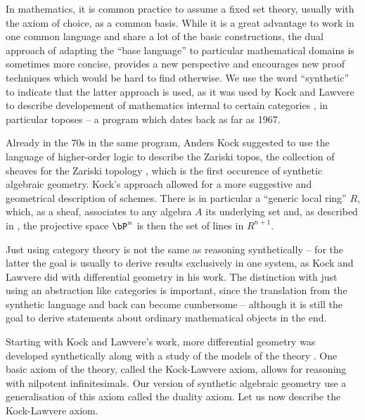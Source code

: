 
In mathematics, it is common practice to assume a fixed set theory, usually with the axiom of choice, as a common basis. While it is a great advantage to work in one common language and share a lot of the basic constructions, the dual approach of adapting the  ``base language'' to particular mathematical domains is sometimes more concise, provides a new perspective and encourages new proof techniques which would be hard to find otherwise.
We use the word ``synthetic'' to indicate that the latter approach is used,
as it was used by Kock and Lawvere to describe developement of mathematics internal to certain categories \cite{lawvere-categorical-dynamics}, in particular toposes -- a program which dates back as far as 1967.

Already in the 70s in the same program, Anders Kock suggested to use the language of higher-order logic \cite{Church40} to describe the Zariski topos, the collection of sheaves for the Zariski topology \cite{Kock74,kockreyes}, which is the first occurence of synthetic algebraic geometry.
Kock's approach allowed for a more suggestive and geometrical description of schemes.
There is in particular a ``generic local ring'' $R$, which, as a sheaf, associates to any algebra $A$ its underlying set and, as described in \cite{kockreyes}, the projective space $\bP^n$ is then the set of lines in $R^{n+1}$.

Just using category theory is not the same as reasoning synthetically -- for the latter the goal is usually to derive results exclusively in one system,
as Kock and Lawvere did with differential geometry in his work.
The distinction with just using an abstraction like categories is important, since the translation from the synthetic language and back can become cumbersome -- although it is still the goal to derive statements about ordinary mathematical objects in the end.

Starting with Kock and Lawvere's work, more differential geometry was developed synthetically \cite{kock-sdg} along with a study of the models of the theory \cite{moerdijk-reyes}.
One basic axiom of the theory, called the Kock-Lawvere axiom, allows for reasoning with nilpotent infinitesimals. Our version of synthetic algebraic geometry use a generalisation of this axiom called the duality axiom. Let us now describe the Kock-Lawvere axiom.

